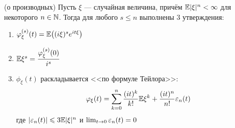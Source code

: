 \begin{theorem} (о производных)
	Пусть $\xi$ --- случайная величина, причём $\mathbb{E} |\xi|^n < \infty$ для некоторого $n \in \mathbb{N}$. Тогда для любого $s \le n$ выполнены 3 утверждения:
	\begin{enumerate}
		\item $\varphi_\xi^{(s)}(t) = \mathbb{E}\big((i\xi)^s e^{it\xi}\big)$
		
		\item $\mathbb{E}\xi^s = \dfrac{\varphi_\xi^{(s)}(0)}{i^s}$
		
		\item $\phi_\xi(t)$ раскладывается <<по формуле Тейлора>>:
		\[
			\varphi_\xi(t) = \sum_{k = 0}^n \frac{(it)^k}{k!} \mathbb{E}\xi^k + \frac{(it)^n}{n!} \varepsilon_n(t)
		\]
		где $|\varepsilon_n(t)| \leqslant 3\mathbb{E} |\xi|^n$ и $\lim_{t \to 0} \varepsilon_n(t) = 0$
	\end{enumerate}
\end{theorem}

